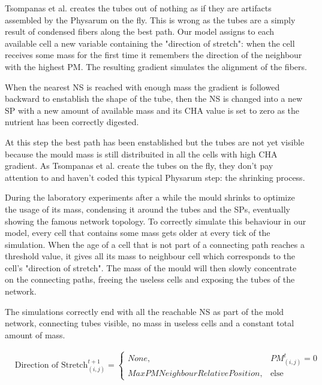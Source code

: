 \par
Tsompanas et al. \cite{Tsompanas2016} creates the tubes out of nothing as if they are artifacts assembled by the Physarum on the fly. This is wrong as the tubes are a simply result of condensed fibers along the best path. Our model assigns to each available cell a new variable containing the "direction of stretch": when the cell receives some mass for the first time it remembers the direction of the neighbour with the highest PM. The resulting gradient simulates the alignment of the fibers.

\par
When the nearest NS is reached with enough mass the gradient is followed backward to enstablish the shape of the tube, then the NS is changed into a new SP with a new amount of available mass and its CHA value is set to zero as the nutrient has been correctly digested.

\par
At this step the best path has been enstablished but the tubes are not yet visible because the mould mass is still distribuited in all the cells with high CHA gradient.
As Tsompanas et al. \cite{Tsompanas2016} create the tubes on the fly, they don't pay attention to and haven't coded this typical Physarum step: the shrinking process.

\par
During the laboratory experiments after a while the mould shrinks to optimize the usage of its mass, condensing it around the tubes and the SPs, eventually showing the famous network topology.
To correctly simulate this behaviour in our model, every cell that contains some mass gets older at every tick of the simulation. When the age of a cell that is not part of a connecting path reaches a threshold value, it gives all its mass to neighbour cell which corresponds to the cell's "direction of stretch". The mass of the mould will then slowly concentrate on the connecting paths, freeing the useless cells and exposing the tubes of the network.

\par
The simulations correctly end with all the reachable NS as part of the mold network, connecting tubes visible, no mass in useless cells and a constant total amount of mass.

\begin{align*} &
\text{Direction of Stretch}^{t+1}_{(i, j)}=
\begin{cases} 
None, & PM^t_{(i, j)}= 0 \\ 
MaxPMNeighbourRelativePosition, & \mbox{else}
\end{cases}
\end{align*}

